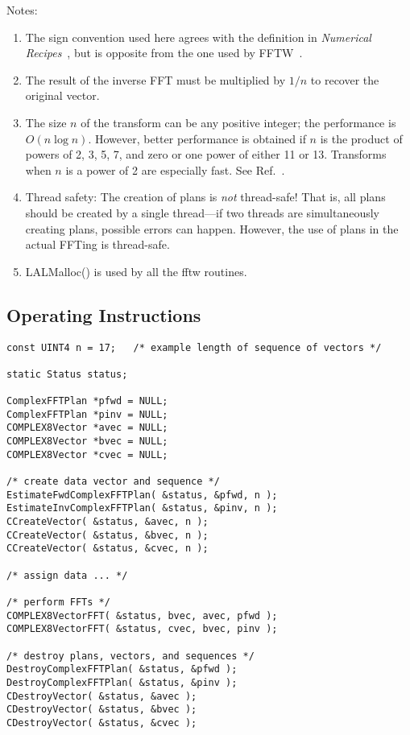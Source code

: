 \documentclass{article}
\begin{document}
Notes:
\begin{enumerate}
\item The sign convention used here agrees with the definition in
\textit{Numerical Recipes}~\cite{ptvf:1992}, but is opposite from the one used
by FFTW~\cite{fj:1998}.
\item The result of the inverse FFT must be multiplied by $1/n$ to recover the
original vector.
\item The size $n$ of the transform can be any positive integer; the
performance is $O(n\log n)$.  However, better performance is obtained if $n$
is the product of powers of 2, 3, 5, 7, and zero or one power of either 11 or
13.  Transforms when $n$ is a power of 2 are especially fast.  See
Ref.~\cite{fj:1998}.
\item Thread safety: The creation of plans is \emph{not} thread-safe!  That
is, all plans should be created by a single thread---if two threads are
simultaneously creating plans, possible errors can happen.  However, the use
of plans in the actual FFTing is thread-safe.
\item LALMalloc() is used by all the fftw routines.
\end{enumerate}

\subsection{Operating Instructions}


\begin{verbatim}
const UINT4 n = 17;   /* example length of sequence of vectors */

static Status status; 

ComplexFFTPlan *pfwd = NULL;
ComplexFFTPlan *pinv = NULL;
COMPLEX8Vector *avec = NULL;
COMPLEX8Vector *bvec = NULL;
COMPLEX8Vector *cvec = NULL;

/* create data vector and sequence */
EstimateFwdComplexFFTPlan( &status, &pfwd, n );
EstimateInvComplexFFTPlan( &status, &pinv, n );
CCreateVector( &status, &avec, n );
CCreateVector( &status, &bvec, n );
CCreateVector( &status, &cvec, n );

/* assign data ... */

/* perform FFTs */
COMPLEX8VectorFFT( &status, bvec, avec, pfwd );
COMPLEX8VectorFFT( &status, cvec, bvec, pinv );

/* destroy plans, vectors, and sequences */
DestroyComplexFFTPlan( &status, &pfwd );
DestroyComplexFFTPlan( &status, &pinv );
CDestroyVector( &status, &avec );
CDestroyVector( &status, &bvec );
CDestroyVector( &status, &cvec );
\end{verbatim}
\end{document}
